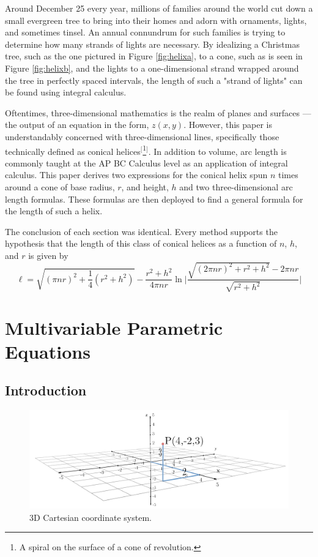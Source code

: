 \documentclass{article}
\begin{document}
Around December 25 every year, millions of families around the world cut down a small evergreen tree to bring into their homes and adorn with ornaments, lights, and sometimes tinsel. An annual connundrum for such families is trying to determine how many strands of lights are necessary. By idealizing a Christmas tree, such as the one pictured in Figure \ref{fig:helixa}, to a cone, such as is seen in Figure \ref{fig:helixb}, and the lights to a one-dimensional strand wrapped around the tree in perfectly spaced intervals, the length of such a "strand of lights" can be found using integral calculus.\par
Oftentimes, three-dimensional mathematics is the realm of planes and surfaces --- the output of an equation in the form, $z(x,y)$. However, this paper is understandably concerned with three-dimensional lines, specifically those technically defined as conical helices$^[$\footnote{A spiral on the surface of a cone of revolution.}$^]$. In addition to volume, arc length is commonly taught at the AP BC Calculus level as an application of integral calculus. This paper derives two expressions for the conical helix spun $n$ times around a cone of base radius, $r$, and height, $h$ and two three-dimensional arc length formulas. These formulas are then deployed to find a general formula for the length of such a helix.\par
The conclusion of each section was identical. Every method supports the hypothesis that the length of this class of conical helices as a function of $n$, $h$, and $r$ is given by
\begin{equation*}
    \ell = \sqrt{(\pi nr)^2+\frac{1}{4}\left(r^2+h^2\right)}-\frac{r^2+h^2}{4\pi nr}\ln\Bigg|\frac{\sqrt{(2\pi nr)^2+r^2+h^2}-2\pi nr}{\sqrt{r^2+h^2}}\Bigg|
\end{equation*}
\newpage



\setcounter{secnumdepth}{3}
\section{Multivariable Parametric Equations}
\subsection{Introduction}

\begin{figure}[h!]
    \centering
    \includegraphics[width=0.711\linewidth]{Blender/cartesian.png}
    \caption{3D Cartesian coordinate system.}
    \label{fig:cart}
\end{figure}
\end{document}
